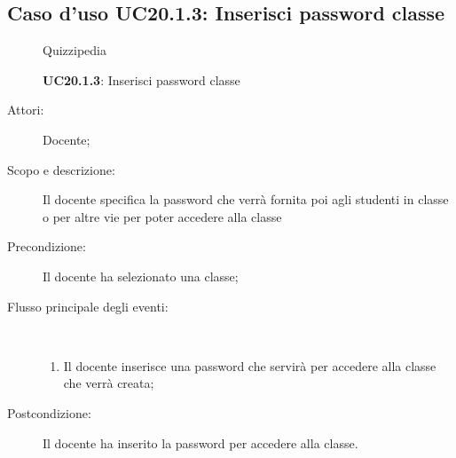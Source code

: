 \subsection{Caso d'uso UC20.1.3: Inserisci password classe}
	\begin{figure}[H]
		\centering
		\begin{resizedtikzpicture}{\textwidth}
		\begin{umlsystem}[x=0, fill=lightgray!20]{Quizzipedia}
		\end{umlsystem}
		\end{resizedtikzpicture}
		\caption{\textbf{UC20.1.3}: Inserisci password classe}
		\label{UC20.1.3}
	\end{figure}
\begin{description}
\item[Attori:] Docente;
\item[Scopo e descrizione:] Il docente specifica la password che verrà fornita poi agli studenti in classe o per altre vie per poter accedere alla classe
      \item[Precondizione:] Il docente ha selezionato una classe;

        \item[Flusso principale degli eventi:] \ 
 \begin{enumerate}
          \item Il docente inserisce una password che servirà per accedere alla classe che verrà creata;

      \end{enumerate}
    \item[Postcondizione:] Il docente ha inserito la password per accedere alla classe.
  \end{description}
\hypertarget{UC20.2}{}
